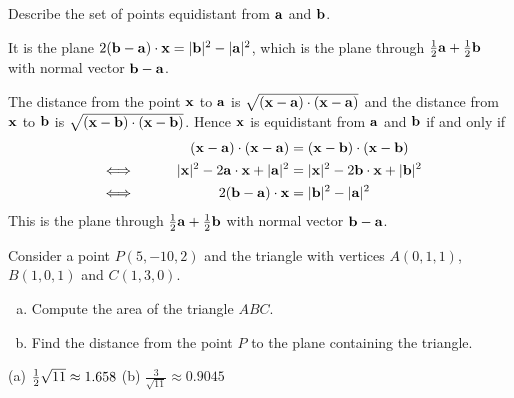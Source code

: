 \begin{question}
 Describe the set of points equidistant from $\mathbf{a}$ and $\mathbf{b}$.
\end{question}


\begin{answer}
It is the plane $2(\mathbf{b}-\mathbf{a})\cdot\mathbf{x}=|\mathbf{b}|^2-|\mathbf{a}|^2$,
which is the plane through $\tfrac{1}{2}\mathbf{a}+\tfrac{1}{2}\mathbf{b}$
with normal vector  $\mathbf{b}-\mathbf{a}$.
\end{answer}

\begin{solution}
The distance from the point $\mathbf{x}$ to $\mathbf{a}$ is 
$\sqrt{(\mathbf{x}-\mathbf{a})\cdot(\mathbf{x}-\mathbf{a})}$ and the distance from $\mathbf{x}$ to $\mathbf{b}$ is
$\sqrt{(\mathbf{x}-\mathbf{b})\cdot(\mathbf{x}-\mathbf{b})}$. Hence $\mathbf{x}$ is equidistant 
from $\mathbf{a}$ and $\mathbf{b}$ if and only if
\begin{alignat*}{3}
& & (\mathbf{x}-\mathbf{a})\cdot(\mathbf{x}-\mathbf{a})&=(\mathbf{x}-\mathbf{b})\cdot(\mathbf{x}-\mathbf{b}) \\
&\iff\qquad & |\mathbf{x}|^2-2\mathbf{a}\cdot\mathbf{x}+|\mathbf{a}|^2&=|\mathbf{x}|^2-2\mathbf{b}\cdot\mathbf{x}+|\mathbf{b}|^2 \\
&\iff & 2(\mathbf{b}-\mathbf{a})\cdot\mathbf{x}&=|\mathbf{b}|^2-|\mathbf{a}|^2
\end{alignat*}
This is the plane through $\tfrac{1}{2}\mathbf{a}+\tfrac{1}{2}\mathbf{b}$
with normal vector  $\mathbf{b}-\mathbf{a}$.
\end{solution}

\begin{question} [M200 2003D] %
Consider a point $P(5,-10,2)$ and the triangle with vertices
$A(0,1,1)$, $B(1,0,1)$ and $C(1,3,0)$.
\begin{enumerate}[(a)]
\item 
Compute the area of the triangle $ABC$.
\item
Find the distance from the point $P$ to the plane containing
the triangle. 
\end{enumerate}
\end{question}


\begin{answer}
(a) $\tfrac{1}{2}\sqrt{11}\approx 1.658$\qquad
(b) $\frac{3}{\sqrt{11}}\approx 0.9045$
\end{answer}

